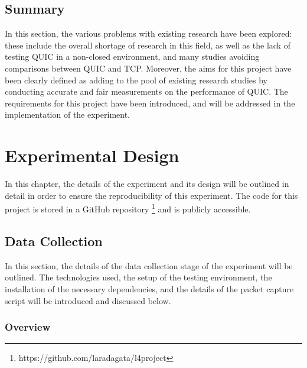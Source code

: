 \documentclass{l4proj}
\begin{document}
\section{Summary}

In this section, the various problems with existing research have been explored: these include the overall shortage of research in this field, as well as the lack of testing QUIC in a non-closed environment, and many studies avoiding comparisons between QUIC and TCP. Moreover, the aims for this project have been clearly defined as adding to the pool of existing research studies by conducting accurate and fair measurements on the performance of QUIC. The requirements for this project have been introduced, and will be addressed in the implementation of the experiment.

\chapter{Experimental Design}

In this chapter, the details of the experiment and its design will be outlined in detail in order to ensure the reproducibility of this experiment. The code for this project is stored in a GitHub repository \footnote{https://github.com/laradagata/l4project} and is publicly accessible. 


\section{Data Collection}

In this section, the details of the data collection stage of the experiment will be outlined. The technologies used, the setup of the testing environment, the installation of the necessary dependencies, and the details of the packet capture script will be introduced and discussed below.

\subsection{Overview} 
\end{document}
